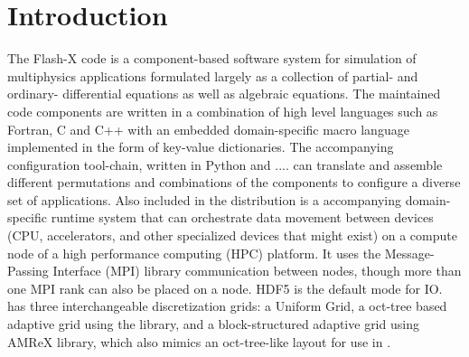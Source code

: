 


\chapter{Introduction}
\label{Sec:Introduction}

The Flash-X code is a component-based software system for simulation
of multiphysics applications formulated largely as a collection of
partial- and ordinary- differential equations as well as algebraic
equations. The maintained code components are written in a combination of high
level languages such as Fortran, C and C++ with an embedded
domain-specific macro language implemented in the form of key-value
dictionaries. The accompanying configuration tool-chain, written in Python and .... 
can translate and assemble different permutations and combinations of
the components to configure a diverse set of applications.  
Also included in the distribution is a accompanying domain-specific
runtime system that can orchestrate data movement between devices
(CPU, accelerators, and other specialized devices that might exist) on a
compute node of a high performance computing (HPC) platform. 
It uses the Message-Passing Interface (MPI) library communication
between nodes, though more than one MPI rank can also be placed on a
node. HDF5 is the default mode for IO. \flashx has three
interchangeable discretization grids: a Uniform Grid, a 
oct-tree based adaptive grid using the \Paramesh
library, and a block-structured adaptive grid using AMReX library,
which also mimics an oct-tree-like layout for use in \flashx.


 